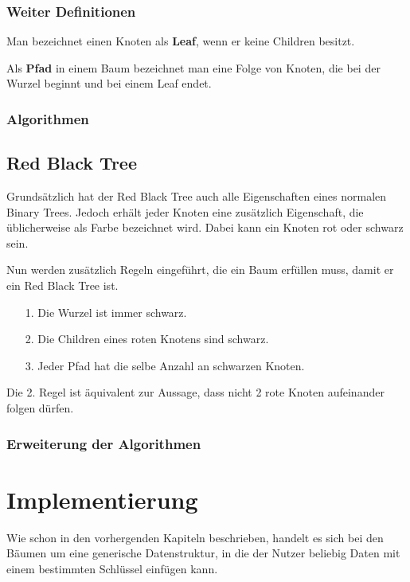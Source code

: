\documentclass[11pt]{article}
\begin{document}
\subsubsection{Weiter Definitionen}
Man bezeichnet einen Knoten als \textbf{Leaf}, wenn er keine Children besitzt.

Als \textbf{Pfad} in einem Baum bezeichnet man eine Folge von Knoten, die bei der Wurzel beginnt und bei einem Leaf endet. 

\subsubsection{Algorithmen}


\subsection{Red Black Tree}

Grundsätzlich hat der Red Black Tree auch alle Eigenschaften eines normalen Binary Trees. Jedoch erhält jeder Knoten eine zusätzlich Eigenschaft, die üblicherweise als Farbe bezeichnet wird.
Dabei kann ein Knoten rot oder schwarz sein.

Nun werden zusätzlich Regeln eingeführt, die ein Baum erfüllen muss, damit er ein Red Black Tree ist.

\begin{itemize}
  \item[1.] Die Wurzel ist immer schwarz.
  \item[2.] Die Children eines roten Knotens sind schwarz.
  \item[3.] Jeder Pfad hat die selbe Anzahl an schwarzen Knoten. 
\end{itemize}

Die 2. Regel ist äquivalent zur Aussage, dass nicht 2 rote Knoten aufeinander folgen dürfen. 

\subsubsection{Erweiterung der Algorithmen}

\section{Implementierung} \label{impl}
Wie schon in den vorhergenden Kapiteln beschrieben, handelt es sich bei den Bäumen um eine generische Datenstruktur, in die der Nutzer beliebig Daten mit einem bestimmten Schlüssel einfügen kann.
\end{document}
